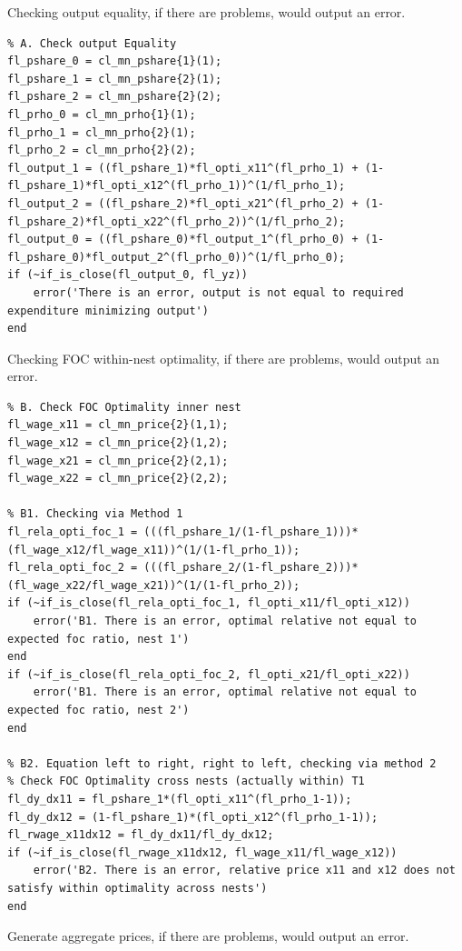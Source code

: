 \documentclass[
]{book}
\begin{document}
Checking output equality, if there are problems, would output an error.

\begin{verbatim}
% A. Check output Equality
fl_pshare_0 = cl_mn_pshare{1}(1);
fl_pshare_1 = cl_mn_pshare{2}(1);
fl_pshare_2 = cl_mn_pshare{2}(2);
fl_prho_0 = cl_mn_prho{1}(1);
fl_prho_1 = cl_mn_prho{2}(1);
fl_prho_2 = cl_mn_prho{2}(2);
fl_output_1 = ((fl_pshare_1)*fl_opti_x11^(fl_prho_1) + (1-fl_pshare_1)*fl_opti_x12^(fl_prho_1))^(1/fl_prho_1);
fl_output_2 = ((fl_pshare_2)*fl_opti_x21^(fl_prho_2) + (1-fl_pshare_2)*fl_opti_x22^(fl_prho_2))^(1/fl_prho_2);
fl_output_0 = ((fl_pshare_0)*fl_output_1^(fl_prho_0) + (1-fl_pshare_0)*fl_output_2^(fl_prho_0))^(1/fl_prho_0);
if (~if_is_close(fl_output_0, fl_yz))
    error('There is an error, output is not equal to required expenditure minimizing output')
end
\end{verbatim}

Checking FOC within-nest optimality, if there are problems, would output
an error.

\begin{verbatim}
% B. Check FOC Optimality inner nest
fl_wage_x11 = cl_mn_price{2}(1,1);
fl_wage_x12 = cl_mn_price{2}(1,2);
fl_wage_x21 = cl_mn_price{2}(2,1);
fl_wage_x22 = cl_mn_price{2}(2,2);

% B1. Checking via Method 1
fl_rela_opti_foc_1 = (((fl_pshare_1/(1-fl_pshare_1)))*(fl_wage_x12/fl_wage_x11))^(1/(1-fl_prho_1));
fl_rela_opti_foc_2 = (((fl_pshare_2/(1-fl_pshare_2)))*(fl_wage_x22/fl_wage_x21))^(1/(1-fl_prho_2));
if (~if_is_close(fl_rela_opti_foc_1, fl_opti_x11/fl_opti_x12))
    error('B1. There is an error, optimal relative not equal to expected foc ratio, nest 1')
end
if (~if_is_close(fl_rela_opti_foc_2, fl_opti_x21/fl_opti_x22))
    error('B1. There is an error, optimal relative not equal to expected foc ratio, nest 2')
end

% B2. Equation left to right, right to left, checking via method 2
% Check FOC Optimality cross nests (actually within) T1
fl_dy_dx11 = fl_pshare_1*(fl_opti_x11^(fl_prho_1-1));
fl_dy_dx12 = (1-fl_pshare_1)*(fl_opti_x12^(fl_prho_1-1));
fl_rwage_x11dx12 = fl_dy_dx11/fl_dy_dx12;
if (~if_is_close(fl_rwage_x11dx12, fl_wage_x11/fl_wage_x12))
    error('B2. There is an error, relative price x11 and x12 does not satisfy within optimality across nests')
end
\end{verbatim}

Generate aggregate prices, if there are problems, would output an error.
\end{document}
